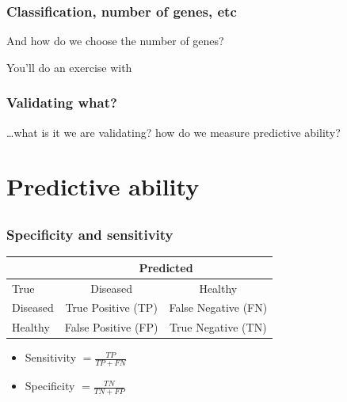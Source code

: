 \begin{frame}
\frametitle{Classification, number of genes, etc}
And how do we choose the number of genes?

\vspace*{15pt}
You'll do an exercise with 
\end{frame}




\begin{frame}
\frametitle{Validating what?}
\ldots what is it we are validating? how do we measure predictive ability?


\end{frame}


\section[Predictive ability]{Predictive ability}
\subsection{}



\begin{frame}
\frametitle{Specificity and sensitivity}
\begin{center}

{\small
\begin{tabular}{l|cc}
 &\multicolumn{2}{c}{Predicted}\\
\hline
True & Diseased & Healthy\\
\hline
Diseased & True Positive (TP) & False Negative (FN)\\
Healthy & False Positive (FP) & True Negative (TN)\\
\hline
\end{tabular}
}
\end{center}


\begin{itemize}
\item Sensitivity $=\frac{TP}{TP + FN}$
\item Specificity $= \frac{TN}{TN + FP}$
\end{itemize}

\end{frame}


